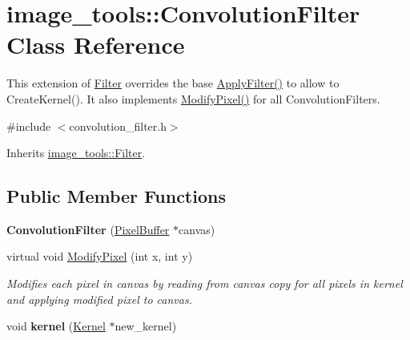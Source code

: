 \hypertarget{classimage__tools_1_1ConvolutionFilter}{}\section{image\+\_\+tools\+:\+:Convolution\+Filter Class Reference}
\label{classimage__tools_1_1ConvolutionFilter}


This extension of \hyperlink{classimage__tools_1_1Filter}{Filter} overrides the base \hyperlink{classimage__tools_1_1Filter_a109d756cc63f596508b3a8e02e89b4bf}{Apply\+Filter()} to allow to Create\+Kernel(). It also implements \hyperlink{classimage__tools_1_1ConvolutionFilter_a73fa6a5a04b95f36a92fcb1b701a3df0}{Modify\+Pixel()} for all Convolution\+Filters.  




{\ttfamily \#include $<$convolution\+\_\+filter.\+h$>$}



Inherits \hyperlink{classimage__tools_1_1Filter}{image\+\_\+tools\+::\+Filter}.

\subsection*{Public Member Functions}
\begin{DoxyCompactItemize}
\item 
{\bfseries Convolution\+Filter} (\hyperlink{classimage__tools_1_1PixelBuffer}{Pixel\+Buffer} $\ast$canvas)\hypertarget{classimage__tools_1_1ConvolutionFilter_acce494f3aa246edda19c7e86993b37c2}{}\label{classimage__tools_1_1ConvolutionFilter_acce494f3aa246edda19c7e86993b37c2}

\item 
virtual void \hyperlink{classimage__tools_1_1ConvolutionFilter_a73fa6a5a04b95f36a92fcb1b701a3df0}{Modify\+Pixel} (int x, int y)\hypertarget{classimage__tools_1_1ConvolutionFilter_a73fa6a5a04b95f36a92fcb1b701a3df0}{}\label{classimage__tools_1_1ConvolutionFilter_a73fa6a5a04b95f36a92fcb1b701a3df0}

\begin{DoxyCompactList}\small\item\em Modifies each pixel in canvas by reading from canvas copy for all pixels in kernel and applying modified pixel to canvas. \end{DoxyCompactList}\item 
void {\bfseries kernel} (\hyperlink{classimage__tools_1_1Kernel}{Kernel} $\ast$new\+\_\+kernel)\hypertarget{classimage__tools_1_1ConvolutionFilter_a532cb2552180d297009c820b55bc43e0}{}\label{classimage__tools_1_1ConvolutionFilter_a532cb2552180d297009c820b55bc43e0}

\end{DoxyCompactItemize}
